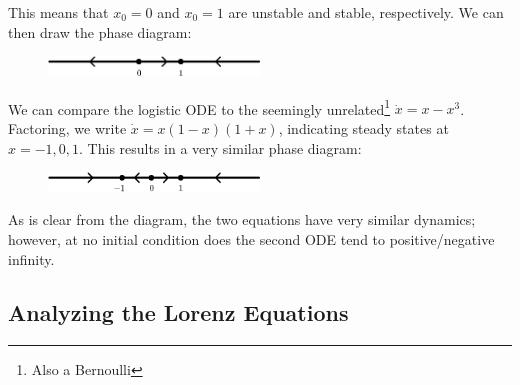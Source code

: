 \documentclass[12pt]{article}
\begin{document}
This means that $x_0 = 0$ and $x_0 = 1$ are unstable and stable, respectively. We can then draw the phase diagram:

\begin{figure}[h!]
  \centering
  \includegraphics*[width=0.5\textwidth]{figures/example1-1-2.png}
\end{figure}

We can compare the logistic ODE to the seemingly unrelated\footnote{Also a Bernoulli} $\dot{x} = x-x^3$. Factoring, we write $\dot{x} = x(1-x)(1+x)$, indicating steady states at $x = -1, 0, 1$. This results in a very similar phase diagram:

\begin{figure}[h!]
  \centering
  \includegraphics*[width=0.5\textwidth]{figures/example1-1-2a.png}
\end{figure}

As is clear from the diagram, the two equations have very similar dynamics; however, at no initial condition does the second ODE tend to positive/negative infinity.

\subsection{Analyzing the Lorenz Equations}
\end{document}
